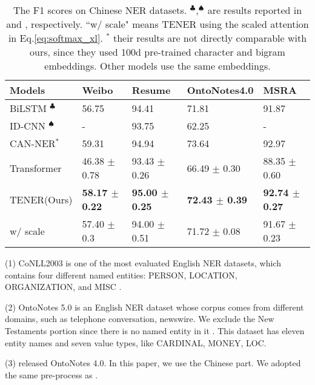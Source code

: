 \documentclass[11pt,a4paper]{article}
\begin{document}
\begin{table*}[t]\small \centering
  \begin{tabular}{lllll}
  \toprule
  	 Models            & Weibo  & Resume    & OntoNotes4.0    & MSRA             \\ \hline
     BiLSTM $^{\clubsuit}$ & 56.75      & 94.41             & 71.81            & 91.87            \\
     ID-CNN $^{\spadesuit}$ & -                 & 93.75             & 62.25            & -                \\
     CAN-NER$^*$ \citep{DBLP:conf/naacl/ZhuW19} & 59.31             & 94.94             & 73.64            & 92.97            \\
     Transformer      & 46.38 $\pm$ 0.78  & 93.43 $\pm$ 0.26  & 66.49 $\pm$  0.30 & 88.35 $\pm$ 0.60 \\
     TENER(Ours)  & \textbf{58.17 $\pm$ 0.22}  & \textbf{95.00 $\pm$ 0.25}  & \textbf{72.43 $\pm$ 0.39} & \textbf{92.74 $\pm$ 0.27} \\
     \quad w/ scale    & 57.40 $\pm$ 0.3  & 94.00 $\pm$ 0.51 & 71.72 $\pm$ 0.08 & 91.67 $\pm$ 0.23\\
     \bottomrule
  \end{tabular}
\caption{The F1 scores on Chinese NER datasets. $^{\clubsuit}$,$^{\spadesuit}$ are results reported in \citep{DBLP:conf/acl/ZhangY18} and \citep{DBLP:conf/ijcai/GuiM0ZJH19}, respectively. ``w/ scale" means TENER using the scaled attention in Eq.\eqref{eq:softmax_xl}.
$^*$ their results are not directly comparable with ours, since they used 100d pre-trained character and bigram embeddings. Other models use the same embeddings.
} \label{tab:cn_ner}
\end{table*}

(1) CoNLL2003 is one of the most evaluated English NER datasets, which contains four different named entities: PERSON, LOCATION, ORGANIZATION, and MISC \cite{DBLP:conf/conll/SangM03}.

(2) OntoNotes 5.0 is an English NER dataset whose corpus comes from different domains, such as telephone conversation, newswire. We exclude the New Testaments portion since there is no named entity in it \cite{chen2019grn,DBLP:journals/tacl/ChiuN16}. This dataset has eleven entity names and seven value types, like CARDINAL, MONEY, LOC.

(3) \citet{Weischedel2011ontonotes} released OntoNotes 4.0. In this paper, we use the Chinese part. We adopted the same pre-process as \cite{DBLP:conf/naacl/CheWML13}.
\end{document}
